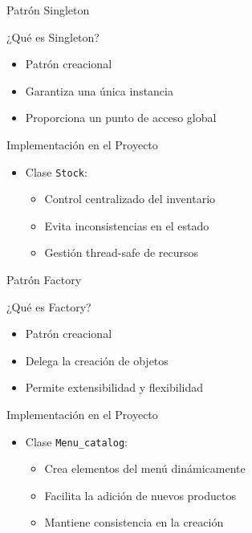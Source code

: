 \documentclass[12pt]{beamer}
\begin{document}
\begin{frame}{Patrón Singleton}
    \begin{exampleblock}{¿Qué es Singleton?}
        \begin{itemize}
            \item Patrón creacional
            \item Garantiza una única instancia
            \item Proporciona un punto de acceso global
        \end{itemize}
    \end{exampleblock}
    \begin{alertblock}{Implementación en el Proyecto}
        \begin{itemize}
            \item Clase \texttt{Stock}:
            \begin{itemize}
                \item Control centralizado del inventario
                \item Evita inconsistencias en el estado
                \item Gestión thread-safe de recursos
            \end{itemize}
        \end{itemize}
    \end{alertblock}
\end{frame}

\begin{frame}{Patrón Factory}
    \begin{exampleblock}{¿Qué es Factory?}
        \begin{itemize}
            \item Patrón creacional
            \item Delega la creación de objetos
            \item Permite extensibilidad y flexibilidad
        \end{itemize}
    \end{exampleblock}
    \begin{alertblock}{Implementación en el Proyecto}
        \begin{itemize}
            \item Clase \texttt{Menu\_catalog}:
            \begin{itemize}
                \item Crea elementos del menú dinámicamente
                \item Facilita la adición de nuevos productos
                \item Mantiene consistencia en la creación
            \end{itemize}
        \end{itemize}
    \end{alertblock}
\end{frame}
\end{document}
